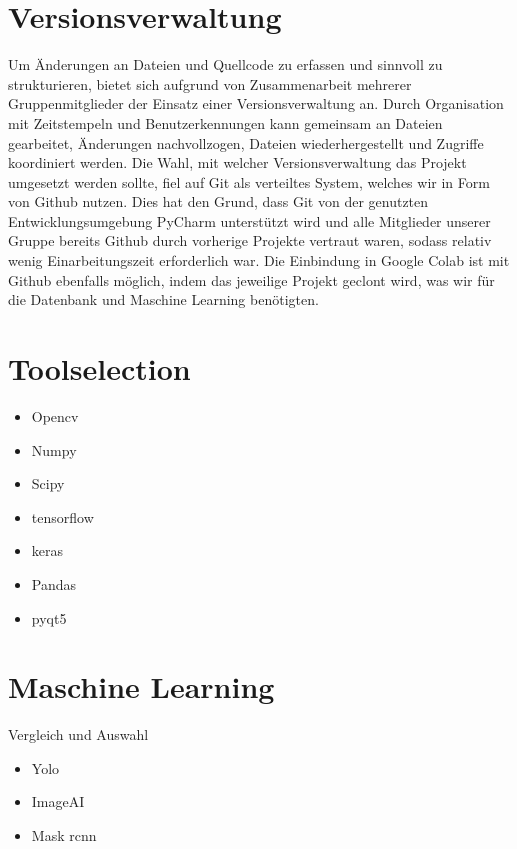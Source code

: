 \section{Versionsverwaltung}
Um Änderungen an Dateien und Quellcode zu erfassen und sinnvoll zu strukturieren, bietet sich aufgrund von Zusammenarbeit mehrerer Gruppenmitglieder der Einsatz einer Versionsverwaltung an. Durch Organisation mit Zeitstempeln und Benutzerkennungen kann gemeinsam an Dateien gearbeitet, Änderungen nachvollzogen, Dateien wiederhergestellt und Zugriffe koordiniert werden. Die Wahl, mit welcher Versionsverwaltung das Projekt umgesetzt werden sollte, fiel auf Git als verteiltes System, welches wir in Form von Github nutzen. Dies hat den Grund, dass Git von der genutzten Entwicklungsumgebung PyCharm unterstützt wird und alle Mitglieder unserer Gruppe bereits Github durch vorherige Projekte vertraut waren, sodass relativ wenig Einarbeitungszeit erforderlich war. Die Einbindung in Google Colab ist mit Github ebenfalls möglich, indem das jeweilige Projekt geclont wird, was wir für die Datenbank und Maschine Learning benötigten.
\section{Toolselection}
\begin{itemize}
	\item{Opencv}
	\item{Numpy}
	\item{Scipy}
	\item{tensorflow}
	\item{keras}
	\item{Pandas}
	\item{pyqt5}
\end{itemize}
	
\section{Maschine Learning}
Vergleich und Auswahl
\begin{itemize}
	\item{Yolo}
	\item{ImageAI}
	\item{Mask rcnn}
\end{itemize}

\newpage

